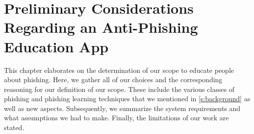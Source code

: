 \section{Preliminary Considerations Regarding an Anti-Phishing Education App}
\label{s:focus}
This chapter elaborates on the determination of our scope to educate people about phishing. 
Here, we gather all of our choices and the corresponding reasoning for our definition of our scope. 
These include the various classes of phishing and phishing learning techniques that we mentioned in \autoref{s:background} as well as new aspects.
Subsequently, we summarize the system requirements and what assumptions we had to make. 
Finally, the limitations of our work are stated.

